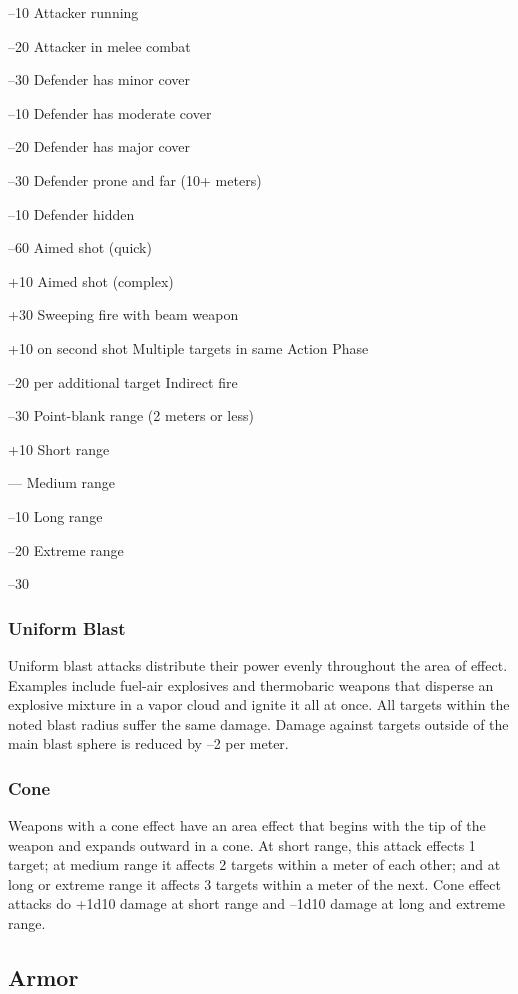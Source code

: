 –10
Attacker running

–20
Attacker in melee combat

–30
Defender has minor cover

–10
Defender has moderate cover

–20
Defender has major cover

–30
Defender prone and far (10+ meters)

–10
Defender hidden

–60
Aimed shot (quick)

+10
Aimed shot (complex)

+30
Sweeping fire with beam weapon

+10 on second shot
Multiple targets in same Action Phase

–20 per additional target
Indirect fire

–30
Point-blank range (2 meters or less)

+10
Short range

—
Medium range

–10
Long range

–20
Extreme range

–30

\subsubsection{Uniform Blast}

Uniform blast attacks distribute their power evenly 
throughout the area of effect. Examples include fuel-air
explosives and thermobaric weapons that disperse
an explosive mixture in a vapor cloud and ignite it all 
at once. All targets within the noted blast radius suffer 
the same damage. Damage against targets outside of 
the main blast sphere is reduced by –2 per meter.

\subsubsection{Cone}

Weapons with a cone effect have an area effect that 
begins with the tip of the weapon and expands outward
in a cone. At short range, this attack effects 1
target; at medium range it affects 2 targets within a 
meter of each other; and at long or extreme range 
it affects 3 targets within a meter of the next. Cone 
effect attacks do +1d10 damage at short range and 
–1d10 damage at long and extreme range.

\subsection{Armor}

